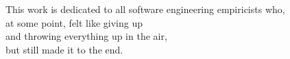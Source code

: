 \begin{dedicatoria}
   \vspace*{\fill}
   \begin{flushright}
     This work is dedicated to all software engineering empiricists who,\\
     at some point, felt like giving up\\
     and throwing everything up in the air,\\
     but still made it to the end.
   \end{flushright}
   \vspace*{\fill}
\end{dedicatoria}
